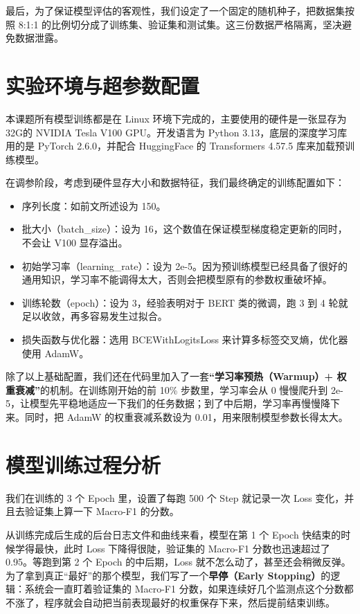 \documentclass[twoside]{thesis-cls-Miya} %
\begin{document}
最后，为了保证模型评估的客观性，我们设定了一个固定的随机种子，把数据集按照 8:1:1 的比例切分成了训练集、验证集和测试集。这三份数据严格隔离，坚决避免数据泄露。

\section{实验环境与超参数配置}
本课题所有模型训练都是在 Linux 环境下完成的，主要使用的硬件是一张显存为32G的 NVIDIA Tesla V100 GPU。开发语言为 Python 3.13，底层的深度学习库用的是 PyTorch 2.6.0，并配合 HuggingFace 的 Transformers 4.57.5 库来加载预训练模型。

在调参阶段，考虑到硬件显存大小和数据特征，我们最终确定的训练配置如下：
\begin{itemize}
	\item
	序列长度：如前文所述设为 150。
	\item
	批大小（batch\_size）：设为 16，这个数值在保证模型梯度稳定更新的同时，不会让 V100 显存溢出。
	\item
	初始学习率（learning\_rate）：设为 2e-5。因为预训练模型已经具备了很好的通用知识，学习率不能调得太大，否则会把模型原有的参数权重破坏掉。
	\item
	训练轮数（epoch）：设为 3，经验表明对于 BERT 类的微调，跑 3 到 4 轮就足以收敛，再多容易发生过拟合。
	\item
	损失函数与优化器：选用 BCEWithLogitsLoss 来计算多标签交叉熵，优化器使用 AdamW。
\end{itemize}

除了以上基础配置，我们还在代码里加入了一套\textbf{“学习率预热（Warmup）+ 权重衰减”}的机制。在训练刚开始的前 10\% 步数里，学习率会从 0 慢慢爬升到 2e-5，让模型先平稳地适应一下我们的任务数据；到了中后期，学习率再慢慢降下来。同时，把 AdamW 的权重衰减系数设为 0.01，用来限制模型参数长得太大。

\section{模型训练过程分析}
我们在训练的 3 个 Epoch 里，设置了每跑 500 个 Step 就记录一次 Loss 变化，并且去验证集上算一下 Macro-F1 的分数。

从训练完成后生成的后台日志文件和曲线来看，模型在第 1 个 Epoch 快结束的时候学得最快，此时 Loss 下降得很陡，验证集的 Macro-F1 分数也迅速超过了 0.95。等跑到第 2 个 Epoch 的中后期，Loss 就不怎么动了，甚至还会稍微反弹。为了拿到真正“最好”的那个模型，我们写了一个\textbf{早停（Early Stopping）}的逻辑：系统会一直盯着验证集的 Macro-F1 分数，如果连续好几个监测点这个分数都不涨了，程序就会自动把当前表现最好的权重保存下来，然后提前结束训练。
\end{document}

